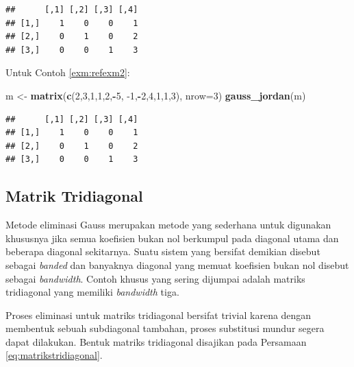 \documentclass[]{book}
\newenvironment{Shaded}{\begin{snugshade}}{\end{snugshade}}
\newcommand{\DataTypeTok}[1]{\textcolor[rgb]{0.13,0.29,0.53}{#1}}
\newcommand{\DecValTok}[1]{\textcolor[rgb]{0.00,0.00,0.81}{#1}}
\newcommand{\KeywordTok}[1]{\textcolor[rgb]{0.13,0.29,0.53}{\textbf{#1}}}
\newcommand{\NormalTok}[1]{#1}
\newcommand{\OperatorTok}[1]{\textcolor[rgb]{0.81,0.36,0.00}{\textbf{#1}}}
\newcommand{\StringTok}[1]{\textcolor[rgb]{0.31,0.60,0.02}{#1}}
\theoremstyle{definition}
\theoremstyle{definition}
\theoremstyle{definition}
\theoremstyle{remark}
\begin{document}
\begin{verbatim}
##      [,1] [,2] [,3] [,4]
## [1,]    1    0    0    1
## [2,]    0    1    0    2
## [3,]    0    0    1    3
\end{verbatim}

Untuk Contoh \ref{exm:refexm2}:

\begin{Shaded}
\begin{Highlighting}[]
\NormalTok{m <-}\StringTok{ }\KeywordTok{matrix}\NormalTok{(}\KeywordTok{c}\NormalTok{(}\DecValTok{2}\NormalTok{,}\DecValTok{3}\NormalTok{,}\DecValTok{1}\NormalTok{,}\DecValTok{1}\NormalTok{,}\DecValTok{2}\NormalTok{,}\OperatorTok{-}\DecValTok{5}\NormalTok{,}
              \DecValTok{-1}\NormalTok{,}\OperatorTok{-}\DecValTok{2}\NormalTok{,}\DecValTok{4}\NormalTok{,}\DecValTok{1}\NormalTok{,}\DecValTok{1}\NormalTok{,}\DecValTok{3}\NormalTok{), }
            \DataTypeTok{nrow=}\DecValTok{3}\NormalTok{)}
\KeywordTok{gauss_jordan}\NormalTok{(m)}
\end{Highlighting}
\end{Shaded}

\begin{verbatim}
##      [,1] [,2] [,3] [,4]
## [1,]    1    0    0    1
## [2,]    0    1    0    2
## [3,]    0    0    1    3
\end{verbatim}

\hypertarget{matriktridiagonal}{%
\subsection{Matrik Tridiagonal}\label{matriktridiagonal}}

Metode eliminasi Gauss merupakan metode yang sederhana untuk digunakan khususnya jika semua koefisien bukan nol berkumpul pada diagonal utama dan beberapa diagonal sekitarnya. Suatu sistem yang bersifat demikian disebut sebagai \emph{banded} dan banyaknya diagonal yang memuat koefisien bukan nol disebut sebagai \emph{bandwidth}. Contoh khusus yang sering dijumpai adalah matriks tridiagonal yang memiliki \emph{bandwidth} tiga.

Proses eliminasi untuk matriks tridiagonal bersifat trivial karena dengan membentuk sebuah subdiagonal tambahan, proses substitusi mundur segera dapat dilakukan. Bentuk matriks tridiagonal disajikan pada Persamaan \eqref{eq:matrikstridiagonal}.
\end{document}
